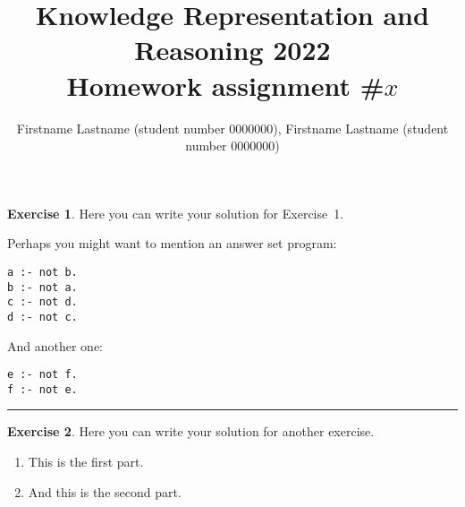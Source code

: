 \documentclass[10pt]{article}
\title{\sffamily \bfseries Knowledge Representation and Reasoning 2022\\
\sffamily \bfseries {\Large Homework assignment \#$x$}}
\author{Firstname Lastname (student number 0000000), Firstname Lastname (student number 0000000)}
\date{}
\def\ContinueLineNumber{\lstset{firstnumber=last}}
\theoremstyle{definition}
\newtheorem{exercise}{Exercise}
\newcommand{\separator}[0]{
  \textcolor{black!80}{\rule{\textwidth}{1.5pt}}
}
\begin{document}
\maketitle

\begin{exercise}
Here you can write your solution for Exercise~1.

Perhaps you might want to mention an answer set program:

\begin{lstlisting}
a :- not b.
b :- not a.
c :- not d.
d :- not c.
\end{lstlisting}

And another one:

\ContinueLineNumber
\begin{lstlisting}
e :- not f.
f :- not e.
\end{lstlisting}
\end{exercise}

\separator{}

\begin{exercise}
Here you can write your solution for another exercise.
\begin{enumerate}[label=(\alph*)]
  \item This is the first part.
  \item And this is the second part.
\end{enumerate}
\end{exercise}
\end{document}
